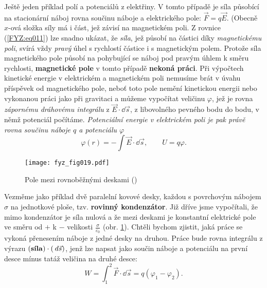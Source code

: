 {    Ještě jeden příklad polí a potenciálů z elektřiny. V tomto případě je síla působící na 
    stacionární náboj rovna součinu náboje a elektrického pole: \(\vec{F}= q\vec{E}\). (Obecně 
    \(x\)-ová složka síly má i část, jež závisí na magnetickém poli. Z rovnice (\ref{FYZ:eq011}) 
    lze snadno ukázat, že \emph{síla}, jež působí na částici díky \emph{magnetickému poli}, svírá 
    vždy \emph{pravý} úhel s rychlostí částice i s magnetickým polem. Protože síla magnetického 
    pole působí na pohybující se náboj pod pravým úhlem k směru rychlosti, \textbf{magnetické pole} 
    v tomto případě \textbf{nekoná práci}. Při výpočtech kinetické energie v elektrickém a 
    magnetickém poli nemusíme brát v úvahu příspěvek od magnetického pole, neboť toto pole nemění 
    kinetickou energii nebo vykonanou práci jako při gravitaci a můžeme vypočítat veličinu 
    \(\varphi\), jež je rovna \emph{zápornému dráhovému integrálu} z \(\vec{E}\cdot\dd{\vec{s}}\), 
    z libovolného pevného bodu do bodu, v němž potenciál počítáme. \emph{Potenciální energie v 
    elektrickém poli je pak právě rovna součinu náboje \(q\) a potenciálu \(\varphi\)}
    \begin{equation}\label{FYZ:eq012}
      \varphi(r) = -\int\vec{E}\cdot\dd{\vec{s}}, \qquad U = q\varphi.
    \end{equation}
    
    \begin{figure}[ht!]  %
      \centering
      \texttt{[image: fyz\_fig019.pdf]}
      \caption{Pole mezi rovnoběžnými deskami (\cite[s.~207]{Feynman01})}
      \label{fyz:fig019}
    \end{figure}   
    Vezměme jako příklad dvě paralelní kovové desky, každou s povrchovým nábojem \(\sigma\) na 
    jednotkové ploše, tzv. \textbf{rovinný kondenzátor}. Již dříve jsme vypočítali, že mimo 
    kondenzátor je síla nulová a že mezi deskami je konstantní elektrické pole ve směru od \(+\) k 
    \(-\) velikosti \(\frac{\sigma}{\varepsilon_0}\) (obr. \ref{fyz:fig019}). Chtěli bychom 
    zjistit, jaká práce se vykoná přenesením náboje z jedné desky na druhou. Práce bude rovna 
    integrálu z výrazu \((\text{\textbf{síla}})\cdot(\hspace{2pt}d\vec{s})\), jenž lze napsat jako součin 
    náboje a potenciálu na první desce mínus tatáž veličina na druhé desce:
    \begin{equation}\label{FYZ:eq013}
      W = \int_1^2\vec{F}\cdot\dd{\vec{s}} = q(\varphi_1 -\varphi_2).
    \end{equation}

}

